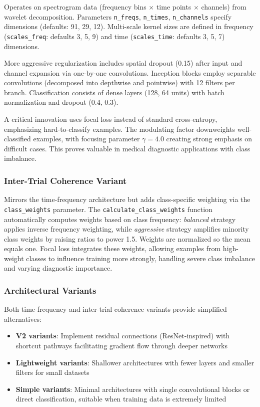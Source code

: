 \documentclass[12pt]{report}
\begin{document}
Operates on spectrogram data (frequency bins $\times$ time points $\times$ channels) from wavelet decomposition. Parameters \verb|n_freqs|, \verb|n_times|, \verb|n_channels| specify dimensions (defaults: 91, 29, 12). Multi-scale kernel sizes are defined in frequency (\verb|scales_freq|: defaults 3, 5, 9) and time (\verb|scales_time|: defaults 3, 5, 7) dimensions.

More aggressive regularization includes spatial dropout (0.15) after input and channel expansion via one-by-one convolutions. Inception blocks employ separable convolutions (decomposed into depthwise and pointwise) with 12 filters per branch. Classification consists of dense layers (128, 64 units) with batch normalization and dropout (0.4, 0.3).

A critical innovation uses focal loss instead of standard cross-entropy, emphasizing hard-to-classify examples. The modulating factor downweights well-classified examples, with focusing parameter $\gamma = 4.0$ creating strong emphasis on difficult cases. This proves valuable in medical diagnostic applications with class imbalance.

\subsubsection{Inter-Trial Coherence Variant}

Mirrors the time-frequency architecture but adds class-specific weighting via the \verb|class_weights| parameter. The \verb|calculate_class_weights| function automatically computes weights based on class frequency: \emph{balanced} strategy applies inverse frequency weighting, while \emph{aggressive} strategy amplifies minority class weights by raising ratios to power 1.5. Weights are normalized so the mean equals one. Focal loss integrates these weights, allowing examples from high-weight classes to influence training more strongly, handling severe class imbalance and varying diagnostic importance.

\subsubsection{Architectural Variants}

Both time-frequency and inter-trial coherence variants provide simplified alternatives:
\begin{itemize}
  \item \textbf{V2 variants}: Implement residual connections (ResNet-inspired) with shortcut pathways facilitating gradient flow through deeper networks
  \item \textbf{Lightweight variants}: Shallower architectures with fewer layers and smaller filters for small datasets
  \item \textbf{Simple variants}: Minimal architectures with single convolutional blocks or direct classification, suitable when training data is extremely limited
\end{itemize}
\end{document}
